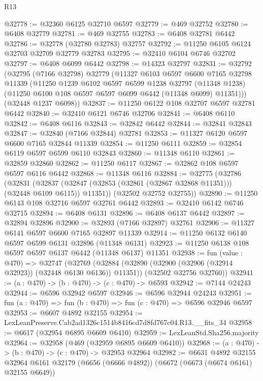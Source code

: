 \begin{lexlean}{R13}
\begin{coremodule}
@32778 := @32360 @6125 @32710 @6597
@32779 := @469 @32752
@32780 := @6408 @32779
@32781 := @469 @32755
@32783 := @6408 @32781 @6442
@32786 := @32778 (@32780 @32783) @32757
@32792 := @11250 @6105 @6124 @32703 @32709 @32779 @32783
@32795 := @32410 @6104 @6746 @32702
@32797 := @6408 @6099 @6442
@32798 := @14323 @32797
@32831 := @32792
    (@32795
      (@7166 @32798)
      @32779
      (@11327
        @6103
        @6597
        @6600
        @7165
        @32798
        @11339
        (@11250
          @1239
          @6102
          @6597
          @6599
          @1238
          @32797
          (@11348 @1238)
          (@11250 @6100 @108 @6597 @6597 @6099 @6442 (@11348 @6099) @11351)))
      (@32448 @1237 @6098))
@32837 := @11250 @6122 @108 @32707 @6597 @32781 @6442
@32840 := @32410 @6121 @6746 @32706
@32841 := @6408 @6110
@32842 := @6408 @6116
@32843 := @32842 @6442
@32844 := @32841 @32843
@32847 := @32840 (@7166 @32844) @32781
@32853 := @11327 @6120 @6597 @6600 @7165 @32844 @11339
@32854 := @11250 @6111
@32859 := @32854 @6119 @6597 @6599 @6110 @32843
@32860 := @11348 @6110
@32861 := @32859 @32860
@32862 := @11250 @6117
@32867 := @32862 @108 @6597 @6597 @6116 @6442
@32868 := @11348 @6116
@32884 := @32775
    (@32786
      (@32831
        (@32837 (@32847 (@32853 (@32861 (@32867 @32868 @11351))) (@32448 @6109 @6115)) @11351))
      (@32502 @32752 @32755))
@32890 := @11250 @6143 @108 @32716 @6597 @32761 @6442
@32893 := @32410 @6142 @6746 @32715
@32894 := @6408 @6131
@32896 := @6408 @6137 @6442
@32897 := @32894 @32896
@32900 := @32893 (@7166 @32897) @32761
@32906 := @11327 @6141 @6597 @6600 @7165 @32897 @11339
@32914 := @11250 @6132 @6140 @6597 @6599 @6131 @32896 (@11348 @6131)
@32923 := @11250 @6138 @108 @6597 @6597 @6137 @6442 (@11348 @6137) @11351
@32938 := fun (value : @470) =>
  @32747
    (@32769
      (@32884 (@32890 (@32900 (@32906 (@32914 @32923)) (@32448 @6130 @6136)) @11351))
      (@32502 @32756 @32760))
@32941 := (a : @470) -> (b : @470) -> (c : @470) -> @6593
@32942 := @7144 @24243
@32944 := @6596 @32942 @6597
@32946 := @6596 @32944 @24243
@32951 := fun (a : @470) => fun (b : @470) => fun (c : @470) => @6596 @32946 @6597
@32953 := @6607 @4892 @32155
@32954 := LexLeanPreserve.Cab2ad1326c1514b8416cd7d8fd767c04.R13.__fits_34
@32958 := @6617 (@32954 @6895 @6609 @6410)
@32959 := LexLeanStd.Sha256.majority
@32964 := @32958 (@469 (@32959 @6895 @6609 @6410))
@32968 := (a : @470) -> (b : @470) -> (c : @470) -> @32953 @32964
@32982 := @6631
    @4892
    @32155
    @32964
    @6161
    @32179
    (@6656 (@6666 @4892))
    (@6672 (@6673 (@6674 @6161) @32155 @6649))

\end{coremodule}
\end{lexlean}
